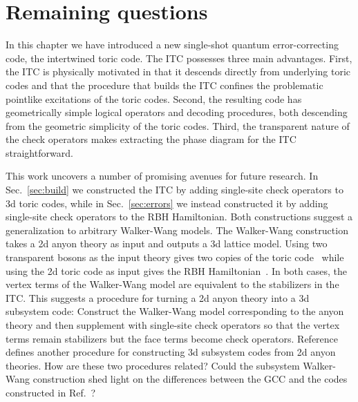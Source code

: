 \section{Remaining questions} \label{sec:questions}

In this chapter we have introduced a new single-shot quantum error-correcting code, the intertwined toric code. The ITC possesses three main advantages. First, the ITC is physically motivated  in that it descends directly from underlying toric codes and that the procedure that builds the ITC confines the problematic pointlike excitations of the toric codes. Second, the resulting code has geometrically simple logical operators and decoding procedures, both descending from the geometric simplicity of the toric codes. Third, the transparent nature of the check operators makes extracting the phase diagram for the ITC straightforward. 

This work uncovers a number of promising avenues for future research. 
In Sec.~\ref{sec:build} we constructed the ITC by adding single-site check operators to 3d toric codes, while in Sec.~\ref{sec:errors} we instead constructed it by adding single-site check operators to the RBH Hamiltonian. Both constructions suggest a generalization to arbitrary Walker-Wang models. The Walker-Wang construction~\cite{WalkerWang2011} takes a 2d anyon theory as input and outputs a 3d lattice model. Using two transparent bosons as the input theory gives two copies of the toric code~\cite{vonKeyserlingk2013SurfaceAnyons} while using the 2d toric code as input gives the RBH Hamiltonian~\cite{Roberts20203Fermion}. In both cases, the vertex terms of the Walker-Wang model are equivalent to the stabilizers in the ITC.
This suggests a procedure for turning a 2d anyon theory into a 3d subsystem code: Construct the Walker-Wang model corresponding to the anyon theory and then supplement with single-site check operators so that the vertex terms remain stabilizers but the face terms become check operators. Reference~\cite{Bridgeman2023Lifting} defines another procedure for constructing 3d subsystem codes from 2d anyon theories. How are these two procedures related? Could the subsystem Walker-Wang construction shed light on the differences between the GCC and the codes constructed in Ref.~\cite{Bridgeman2023Lifting}?

